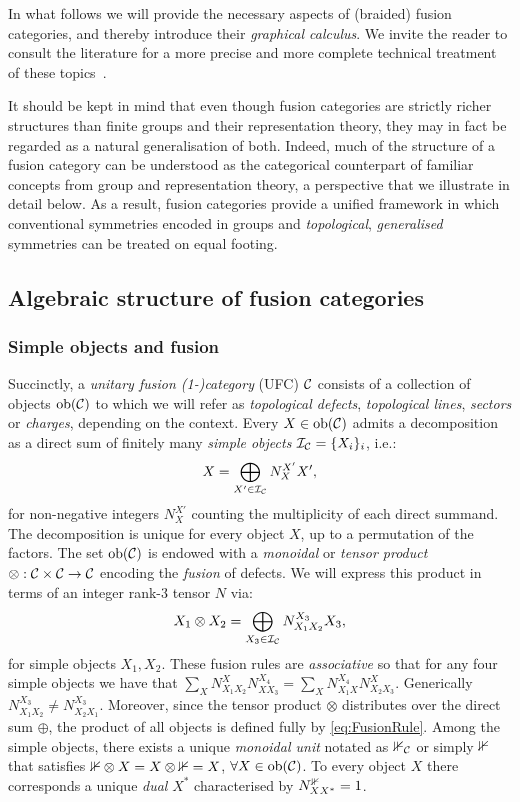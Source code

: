 In what follows we will provide the necessary aspects of (braided) fusion categories, and thereby introduce their \emph{graphical calculus}. We invite the reader to consult the literature for a more precise and more complete technical treatment of these topics~\cite{Etingof2002,Kitaev2005a,Etingof2015,Beer2018}.

\bigskip\noindent It should be kept in mind that even though fusion categories are strictly richer structures than finite groups and their representation theory, they may in fact be regarded as a natural generalisation of both. Indeed, much of the structure of a fusion category can be understood as the categorical counterpart of familiar concepts from group and representation theory, a perspective that we illustrate in detail below. As a result, fusion categories provide a unified framework in which conventional symmetries encoded in groups and \emph{topological}, \emph{generalised} symmetries can be treated on equal footing.
\subsection{Algebraic structure of fusion categories}
\subsubsection{Simple objects and fusion}
Succinctly, a \emph{unitary fusion (1-)category} (UFC) $\mathcal{C}$ consists of a collection of objects ${\rm ob}(\mathcal{C})$ to which we will refer as \emph{topological defects}, \emph{topological lines}, \emph{sectors} or \emph{charges}, depending on the context. Every $X\in{\rm ob}(\mathcal{C})$ admits a decomposition as a direct sum of finitely many \emph{simple objects} $\mathcal{I}_{\mathcal{C}}=\{X_i\}_i$, i.e.:
\begin{equation}
	X = \bigoplus_{X'\in\mathcal{I}_{\mathcal{C}}} N_{X}^{X'} X',
\end{equation}
for non-negative integers $N_{X}^{X'}$ counting the multiplicity of each direct summand. The decomposition is unique for every object $X$, up to a permutation of the factors. The set ${\rm ob}(\mathcal{C})$ is endowed with a \emph{monoidal} or \emph{tensor product} $\otimes: \mathcal{C}\times\mathcal{C}\rightarrow\mathcal{C}$ encoding the \emph{fusion} of defects. We will express this product in terms of an integer rank-3 tensor $N$ via:
\begin{equation}\label{eq:FusionRule}
	X_1 \otimes X_2 = \bigoplus_{X_3\in\mathcal{I}_{\mathcal{C}}} N_{X_1X_2}^{X_3} X_3,
\end{equation}
for simple objects $X_1, X_2$. These fusion rules are \emph{associative} so that for any four simple objects we have that $\sum_X N_{X_1X_2}^X N_{XX_3}^{X_4} = \sum_X N_{X_1X}^{X_4} N_{X_2X_3}^X$. Generically $N_{X_1X_2}^{X_3}\neq N_{X_2X_1}^{X_3}$. Moreover, since the tensor product $\otimes$ distributes over the direct sum $\oplus$, the product of all objects is defined fully by \cref{eq:FusionRule}. Among the simple objects, there exists a unique \emph{monoidal unit} notated as $\mathbb 1_{\mathcal{C}}$ or simply $\mathbb 1$ that satisfies $\mathbb 1\otimes X= X\otimes\mathbb 1= X$, $\forall X\in{\rm ob}(\mathcal{C})$. To every object $X$ there corresponds a unique \emph{dual} $X^*$ characterised by $N_{XX^*}^{\mathbb 1} = 1$.

